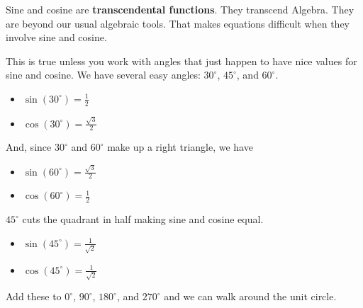 \documentclass{ximera}
\begin{document}
Sine and cosine are \textbf{transcendental functions}.  They transcend Algebra. They are beyond our usual algebraic tools.  That makes equations difficult when they involve sine and cosine.


This is true unless you work with angles that just happen to have nice values for sine and cosine.  We have several easy angles: $30^{\circ}$, $45^{\circ}$, and $60^{\circ}$.




\begin{itemize}
\item $\sin(30^{\circ}) = \frac{1}{2}$
\item $\cos(30^{\circ}) = \frac{\sqrt{3}}{2}$
\end{itemize}


And, since $30^{\circ}$ and $60^{\circ}$ make up a right triangle, we have 


\begin{itemize}
\item $\sin(60^{\circ}) = \frac{\sqrt{3}}{2}$
\item $\cos(60^{\circ}) = \frac{1}{2}$
\end{itemize}




$45^{\circ}$ cuts the quadrant in half making sine and cosine equal.

\begin{itemize}
\item $\sin(45^{\circ}) = \frac{1}{\sqrt{2}}$
\item $\cos(45^{\circ}) = \frac{1}{\sqrt{2}}$
\end{itemize}



Add these to $0^{\circ}$, $90^{\circ}$, $180^{\circ}$, and $270^{\circ}$ and we can walk around the unit circle.
\end{document}
